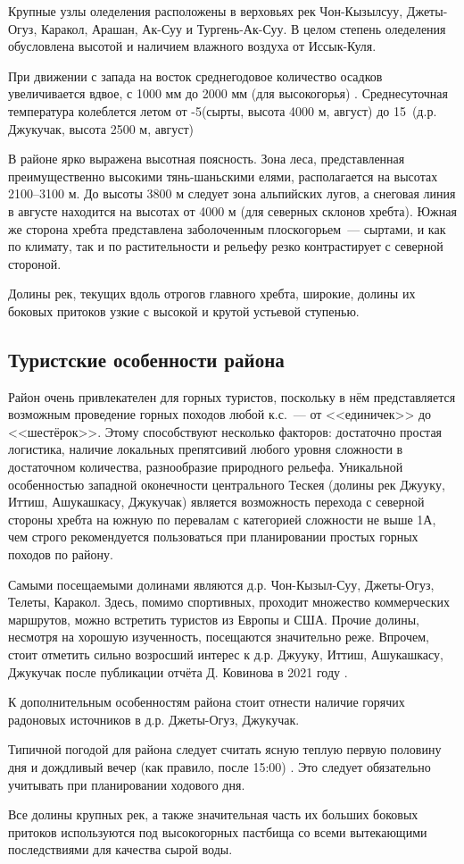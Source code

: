 Крупные узлы оледеления расположены в верховьях рек Чон-Кызылсуу, Джеты-Огуз, Каракол, Арашан, Ак-Суу и Тургень-Ак-Суу. В целом степень оледеления обусловлена высотой и наличием влажного воздуха от Иссык-Куля.

При движении с запада на восток среднегодовое количество осадков увеличивается вдвое, с 1000 мм до 2000 мм (для высокогорья) \cite{rodina2012}. Среднесуточная температура колеблется летом от -5\degree (сырты, высота 4000 м, август) до 15\degree~(д.р. Джукучак, высота 2500 м, август)

В районе ярко выражена высотная поясность. Зона леса, представленная преимущественно высокими тянь-шаньскими елями, располагается на высотах 2100--3100 м. До высоты 3800 м следует зона альпийских лугов, а снеговая линия в августе находится на высотах от 4000 м (для северных склонов хребта). Южная же сторона хребта представлена заболоченным плоскогорьем~--- сыртами, и как по климату, так и по растительности и рельефу резко контрастирует с северной стороной.

Долины рек, текущих вдоль отрогов главного хребта, широкие, долины их боковых притоков узкие с высокой и крутой устьевой ступенью.

\subsection{Туристские особенности района}
Район очень привлекателен для горных туристов, поскольку в нём представляется возможным проведение горных походов любой к.с.~--- от <<единичек>> до <<шестёрок>>. Этому способствуют несколько факторов: достаточно простая логистика, наличие локальных препятсивий любого уровня сложности в достаточном количества, разнообразие природного рельефа. Уникальной особенностью западной оконечности центрального Тескея (долины рек Джууку, Иттиш, Ашукашкасу, Джукучак) является возможность перехода с северной стороны хребта на южную по перевалам с категорией сложности не выше 1А, чем строго рекомендуется пользоваться при планировании простых горных походов по району.

Самыми посещаемыми долинами являются д.р. Чон-Кызыл-Суу, Джеты-Огуз, Телеты, Каракол. Здесь, помимо спортивных, проходит множество коммерческих маршрутов, можно встретить туристов из Европы и США. Прочие долины, несмотря на хорошую изученность, посещаются значительно реже. Впрочем, стоит отметить сильно возросший интерес к д.р. Джууку, Иттиш, Ашукашкасу, Джукучак после публикации отчёта Д. Ковинова в 2021 году \cite{kovinov2021}.

К дополнительным особенностям района стоит отнести наличие горячих радоновых источников в д.р. Джеты-Огуз, Джукучак.

Типичной погодой для района следует считать ясную теплую первую половину дня и дождливый вечер (как правило, после 15:00) \cite{rodina2012, tipsina2024, sergeev2024, smurov2024}. Это следует обязательно учитывать при планировании ходового дня.

Все долины крупных рек, а также значительная часть их больших боковых притоков используются под высокогорных пастбища со всеми вытекающими последствиями для качества сырой воды.

\clearpage